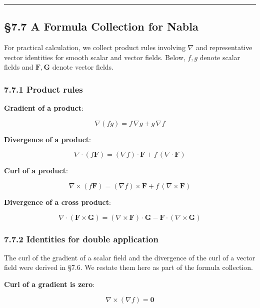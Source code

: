 \begin{center}\rule{0.5\linewidth}{0.5pt}\end{center}

\hypertarget{a-formula-collection-for-nabla}{%
\subsection{§7.7 A Formula Collection for
Nabla}\label{a-formula-collection-for-nabla}}

For practical calculation, we collect product rules involving \(\nabla\)
and representative vector identities for smooth scalar and vector
fields. Below, \(f, g\) denote scalar fields and
\(\mathbf{F}, \mathbf{G}\) denote vector fields.

\hypertarget{product-rules}{%
\subsubsection{7.7.1 Product rules}\label{product-rules}}

\textbf{Gradient of a product}:

\[\nabla(fg) = f\,\nabla g + g\,\nabla f\]

\textbf{Divergence of a product}:

\[\nabla \cdot (f\mathbf{F}) = (\nabla f) \cdot \mathbf{F} + f\,(\nabla \cdot \mathbf{F})\]

\textbf{Curl of a product}:

\[\nabla \times (f\mathbf{F}) = (\nabla f) \times \mathbf{F} + f\,(\nabla \times \mathbf{F})\]

\textbf{Divergence of a cross product}:

\[\nabla \cdot (\mathbf{F} \times \mathbf{G}) = (\nabla \times \mathbf{F}) \cdot \mathbf{G} - \mathbf{F} \cdot (\nabla \times \mathbf{G})\]

\hypertarget{identities-for-double-application}{%
\subsubsection{7.7.2 Identities for double
application}\label{identities-for-double-application}}

The curl of the gradient of a scalar field and the divergence of the
curl of a vector field were derived in §7.6. We restate them here as
part of the formula collection.

\textbf{Curl of a gradient is zero}:

\[\nabla \times (\nabla f) = \mathbf{0}\]

